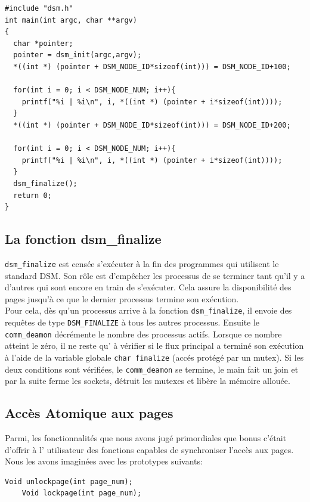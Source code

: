 \begin{lstlisting}[style=CStyle]
#include "dsm.h"
int main(int argc, char **argv)
{
  char *pointer;
  pointer = dsm_init(argc,argv);
  *((int *) (pointer + DSM_NODE_ID*sizeof(int))) = DSM_NODE_ID+100;
  
  for(int i = 0; i < DSM_NODE_NUM; i++){
    printf("%i | %i\n", i, *((int *) (pointer + i*sizeof(int))));
  }
  *((int *) (pointer + DSM_NODE_ID*sizeof(int))) = DSM_NODE_ID+200;
  
  for(int i = 0; i < DSM_NODE_NUM; i++){
    printf("%i | %i\n", i, *((int *) (pointer + i*sizeof(int))));
  }
  dsm_finalize();
  return 0;
}
\end{lstlisting}\newpage




\subsection{ La fonction dsm\_finalize}
\begin{center}
\end{center}
\setlength{\parindent}{5ex}

\texttt{dsm\_finalize} est censée s'exécuter à la fin des programmes qui utilisent le standard DSM. Son rôle est d'empêcher les processus de se terminer tant qu'il y a d'autres qui sont encore en train de s'exécuter. Cela assure la disponibilité des pages jusqu'à ce que le dernier processus termine son exécution.\\ Pour cela, dès qu'un processus arrive à la fonction \texttt{dsm\_finalize}, il envoie des requêtes de type \texttt{DSM\_FINALIZE} à tous les autres processus. Ensuite le \texttt{comm\_deamon} décrémente le nombre des processus actifs. Lorsque ce nombre atteint le zéro, il ne reste qu' à vérifier si le flux principal a terminé son exécution à l'aide de la variable globale \texttt{char finalize} (accés protégé par un mutex). Si les deux conditions sont vérifiées, le \texttt{comm\_deamon} se termine, le main fait un join et par la suite ferme les sockets, détruit les mutexes et libère la mémoire allouée.

\subsection{ Accès Atomique aux pages}
Parmi, les fonctionnalités que nous avons jugé primordiales que bonus c’était d’offrir à l' utilisateur des fonctions capables de synchroniser l'accès aux pages. Nous les avons imaginées avec les prototypes suivants:
\begin{lstlisting}[style=CStyle]
    Void unlockpage(int page_num);
    Void lockpage(int page_num);
\end{lstlisting}

